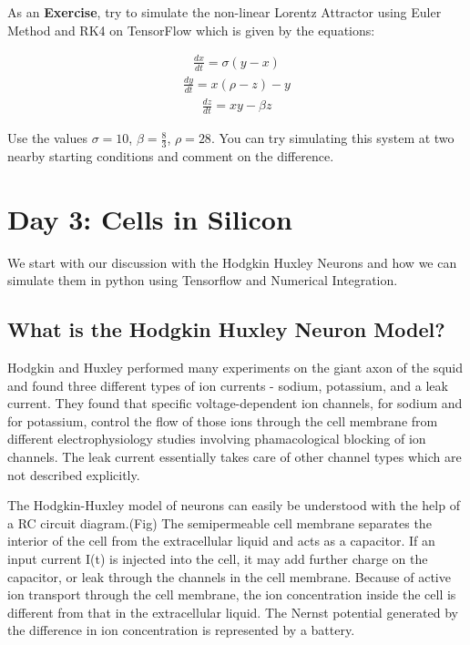 \documentclass[10pt,letterpaper]{article}
\begin{document}
As an \textbf{Exercise}, try to simulate the non-linear Lorentz Attractor using Euler Method and RK4 on TensorFlow which is given by the equations:

\begin{eqnarray}\frac{dx}{dt}=\sigma(y-x) \end{eqnarray}
\begin{eqnarray}\frac{dy}{dt}=x(\rho-z)-y \end{eqnarray}
\begin{eqnarray}\frac{dz}{dt}=xy-\beta z \end{eqnarray}

Use the values $\sigma =10$, $\beta =\frac{8}{3}$, $\rho =28$. You can try simulating this system at two nearby starting conditions and comment on the difference.

\section*{Day 3: Cells in Silicon}

We start with our discussion with the Hodgkin Huxley Neurons and how we can simulate them in python using Tensorflow and Numerical Integration.

\subsection*{What is the Hodgkin Huxley Neuron Model?}

Hodgkin and Huxley performed many experiments on the giant axon of the squid and found three different types of ion currents - sodium, potassium, and a leak current. They found that specific voltage-dependent ion channels, for sodium and for potassium, control the flow of those ions through the cell membrane from different electrophysiology studies involving phamacological blocking of ion channels. The leak current essentially takes care of other channel types which are not described explicitly. 

The Hodgkin-Huxley model of neurons can easily be understood with the help of a RC circuit diagram.(Fig) The semipermeable cell membrane separates the interior of the cell from the extracellular liquid and acts as a capacitor. If an input current I(t) is injected into the cell, it may add further charge on the capacitor, or leak through the channels in the cell membrane. Because of active ion transport through the cell membrane, the ion concentration inside the cell is different from that in the extracellular liquid. The Nernst potential generated by the difference in ion concentration is represented by a battery.
\end{document}
